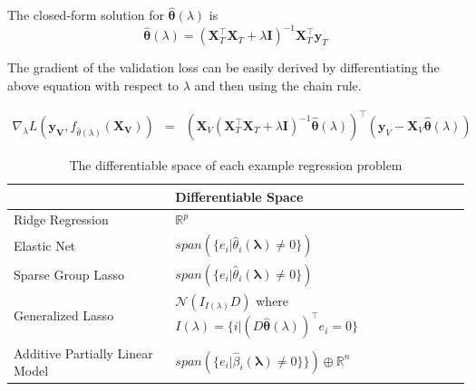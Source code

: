 \documentclass[10pt,letterpaper]{article}
\begin{document}
The closed-form solution for $\hat{\boldsymbol{\theta}}(\lambda)$ is
\begin{equation}
\hat{\boldsymbol{\theta}} (\lambda) = (\boldsymbol{X}_T^\top\boldsymbol{X}_T + \lambda \boldsymbol{I})^{-1}\boldsymbol{X}_T^\top\boldsymbol{y}_T
\end{equation}

The gradient of the validation loss can be easily derived by differentiating the above equation with respect to $\lambda$ and then using the chain rule.

\begin{equation}
\begin{array} {lcl}
\nabla_{\lambda} L(\boldsymbol{y_V}, f_{\hat \theta(\lambda)}(\boldsymbol{X_V}))
&=& (\boldsymbol{X}_V(\boldsymbol{X}_T^\top \boldsymbol{X}_T + \lambda \boldsymbol{I})^{-1}
\hat{\boldsymbol{\theta}}(\lambda))^{\top}
(\boldsymbol{y}_V - \boldsymbol{X}_V \hat{\boldsymbol{\theta}}(\lambda))
\end{array}
\end{equation}

\begin{table} 
\begin{center}

\begin{tabular}{| l | l | l | }
\hline
 &  Differentiable Space \\
\hline
Ridge Regression & $\mathbb{R}^p$\\
\hline
Elastic Net & $span(\{e_i | \hat{\theta}_i\left(\boldsymbol{\lambda}\right) \ne 0 \})$\\
\hline
Sparse Group Lasso & $span(\{e_i | \hat{\theta}_i\left(\boldsymbol{\lambda}\right) \ne 0 \})$ \\
\hline
Generalized Lasso & $\mathcal{N}(I_{I(\lambda)} D)$ where $I(\lambda) = \{ i | (D \hat{\boldsymbol{\theta}}(\lambda))^\top e_i = 0 \}$ \\
\hline
Additive Partially Linear Model & $span(\{e_i | \hat{\beta}_i\left(\boldsymbol{\lambda}\right) \ne 0 \} \})  \oplus  \mathbb{R}^{n}$\\
\hline
\end{tabular}
\end{center}
\caption {The differentiable space of each example regression problem}
\label{table:differentiableSpace}
\end{table}
\end{document}
